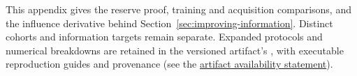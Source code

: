 This appendix gives the reserve proof, training and acquisition comparisons, and the influence derivative behind Section~\ref{sec:improving-information}. Distinct cohorts and information targets remain separate. Expanded protocols and numerical breakdowns are retained in the versioned artifact's , with executable reproduction guides and provenance (see the \hyperref[sec:artifact-availability]{artifact availability statement}).






